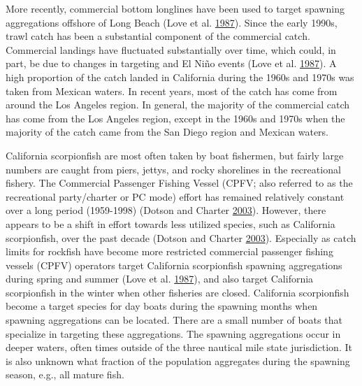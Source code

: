 \documentclass[12pt,]{article}
\begin{document}
More recently, commercial bottom longlines have been used to target
spawning aggregations offshore of Long Beach (Love et al.
\protect\hyperlink{ref-Love1987}{1987}). Since the early 1990s, trawl
catch has been a substantial component of the commercial catch.
Commercial landings have fluctuated substantially over time, which
could, in part, be due to changes in targeting and El
\(\text{Ni\~{n}o}\) events (Love et al.
\protect\hyperlink{ref-Love1987}{1987}). A high proportion of the catch
landed in California during the 1960s and 1970s was taken from Mexican
waters. In recent years, most of the catch has come from around the Los
Angeles region. In general, the majority of the commercial catch has
come from the Los Angeles region, except in the 1960s and 1970s when the
majority of the catch came from the San Diego region and Mexican waters.

California scorpionfish are most often taken by boat fishermen, but
fairly large numbers are caught from piers, jettys, and rocky shorelines
in the recreational fishery. The Commercial Passenger Fishing Vessel
(CPFV; also referred to as the recreational party/charter or PC mode)
effort has remained relatively constant over a long period (1959-1998)
(Dotson and Charter \protect\hyperlink{ref-Dotson2003}{2003}). However,
there appears to be a shift in effort towards less utilized species,
such as California scorpionfish, over the past decade (Dotson and
Charter \protect\hyperlink{ref-Dotson2003}{2003}). Especially as catch
limits for rockfish have become more restricted commercial passenger
fishing vessels (CPFV) operators target California scorpionfish spawning
aggregations during spring and summer (Love et al.
\protect\hyperlink{ref-Love1987}{1987}), and also target California
scorpionfish in the winter when other fisheries are closed. California
scorpionfish become a target species for day boats during the spawning
months when spawning aggregations can be located. There are a small
number of boats that specialize in targeting these aggregations. The
spawning aggregations occur in deeper waters, often times outside of the
three nautical mile state jurisdiction. It is also unknown what fraction
of the population aggregates during the spawning season, e.g., all
mature fish.
\end{document}
